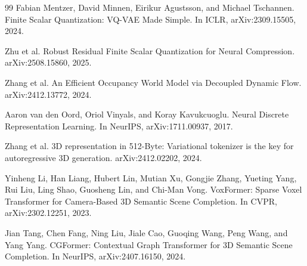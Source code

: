 \documentclass[11pt,a4paper]{article}
\begin{document}
\begin{thebibliography}{99}
Fabian Mentzer, David Minnen, Eirikur Agustsson, and Michael Tschannen.
\newblock Finite Scalar Quantization: VQ-VAE Made Simple.
\newblock In ICLR, arXiv:2309.15505, 2024.

Zhu et al.
\newblock Robust Residual Finite Scalar Quantization for Neural Compression.
\newblock arXiv:2508.15860, 2025.

Zhang et al.
\newblock An Efficient Occupancy World Model via Decoupled Dynamic Flow.
\newblock arXiv:2412.13772, 2024.

Aaron van den Oord, Oriol Vinyals, and Koray Kavukcuoglu.
\newblock Neural Discrete Representation Learning.
\newblock In NeurIPS, arXiv:1711.00937, 2017.

Zhang et al.
\newblock 3D representation in 512-Byte: Variational tokenizer is the key for autoregressive 3D generation.
\newblock arXiv:2412.02202, 2024.

Yinheng Li, Han Liang, Hubert Lin, Mutian Xu, Gongjie Zhang, Yueting Yang, Rui Liu, Ling Shao, Guosheng Lin, and Chi-Man Vong.
\newblock VoxFormer: Sparse Voxel Transformer for Camera-Based 3D Semantic Scene Completion.
\newblock In CVPR, arXiv:2302.12251, 2023.

Jian Tang, Chen Fang, Ning Liu, Jiale Cao, Guoqing Wang, Peng Wang, and Yang Yang.
\newblock CGFormer: Contextual Graph Transformer for 3D Semantic Scene Completion.
\newblock In NeurIPS, arXiv:2407.16150, 2024.

\end{thebibliography}
\end{document}
